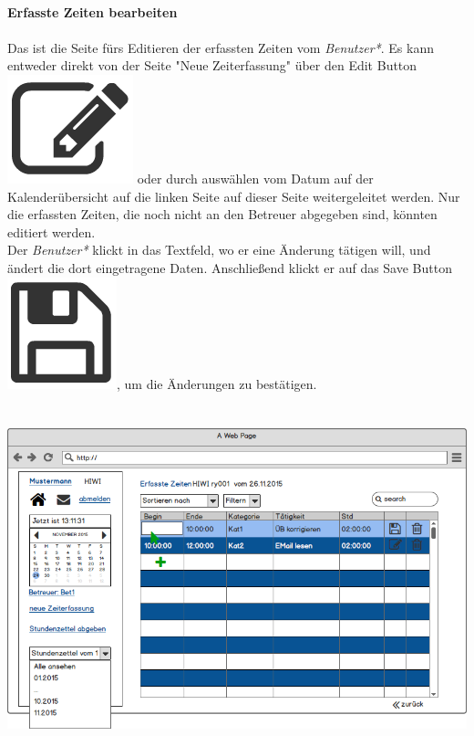 \newpage
\textbf{\\Erfasste Zeiten bearbeiten}\\
\\
Das ist die Seite fürs Editieren der erfassten Zeiten vom \emph{Benutzer*}.
Es kann entweder direkt von der Seite "Neue Zeiterfassung" über den Edit Button \includegraphics[scale=.1]{UI/Button/Edit.png} oder durch auswählen vom Datum auf der Kalenderübersicht auf die linken Seite auf dieser Seite weitergeleitet werden. Nur die erfassten Zeiten, die noch nicht an den Betreuer abgegeben sind, könnten editiert werden.\\
Der \emph{Benutzer*} klickt in das Textfeld, wo er eine Änderung tätigen will, und ändert die dort eingetragene Daten. Anschließend klickt er auf das Save Button \includegraphics[scale=.1]{UI/Button/Save.png}, um die Änderungen zu bestätigen.\\
\\
\\
\includegraphics[width=\linewidth]{UI/Benutzer/Editieren.png}





